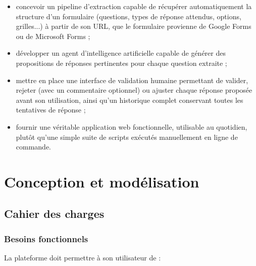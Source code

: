 \documentclass[12pt,a4paper]{report}
\begin{document}
\begin{itemize}
    \item concevoir un pipeline d'extraction capable de récupérer
    automatiquement la structure d'un formulaire (questions, types de
    réponse attendus, options, grilles...) à partir de son URL, que le
    formulaire provienne de Google Forms ou de Microsoft Forms ;
    \item développer un agent d'intelligence artificielle capable de
    générer des propositions de réponses pertinentes pour chaque question
    extraite ;
    \item mettre en place une interface de validation humaine permettant
    de valider, rejeter (avec un commentaire optionnel) ou ajuster
    chaque réponse proposée avant son utilisation, ainsi
    qu'un historique complet conservant toutes les tentatives de réponse ;
    \item fournir une véritable application web fonctionnelle, utilisable
    au quotidien, plutôt qu'une simple suite de scripts exécutés
    manuellement en ligne de commande.
\end{itemize}

\chapter{Conception et modélisation}

\section{Cahier des charges}

\subsection{Besoins fonctionnels}

La plateforme doit permettre à son utilisateur de :
\end{document}
